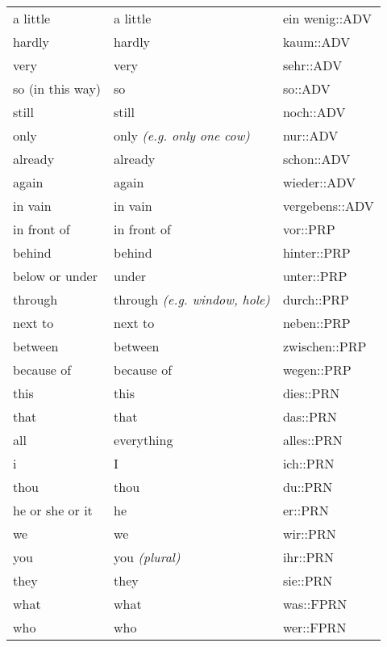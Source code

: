 \begin{center}
\begin{longtable}{lll}
{\sc \lowercase{	A LITTLE	}}	&	a little		&	ein wenig::ADV	\\
{\sc \lowercase{	HARDLY	}}	&	hardly		&	kaum::ADV	\\
{\sc \lowercase{	VERY	}}	&	very		&	sehr::ADV	\\
{\sc \lowercase{	SO \footnotesize (IN THIS WAY)	}}	&	so		&	so::ADV	\\
{\sc \lowercase{	STILL	}}	&	still		&	noch::ADV	\\
{\sc \lowercase{	ONLY	}}	&	only	\textit{\footnotesize (e.g. only one cow)}	&	nur::ADV	\\
{\sc \lowercase{	ALREADY	}}	&	already		&	schon::ADV	\\
{\sc \lowercase{	AGAIN	}}	&	again		&	wieder::ADV	\\
{\sc \lowercase{	IN VAIN	}}	&	in vain		&	vergebens::ADV	\\
{\sc \lowercase{	IN FRONT OF	}}	&	in front of		&	vor::PRP	\\
{\sc \lowercase{	BEHIND	}}	&	behind		&	hinter::PRP	\\
{\sc \lowercase{	BELOW OR UNDER	}}	&	under		&	unter::PRP	\\
{\sc \lowercase{	THROUGH	}}	&	through	\textit{\footnotesize (e.g. window, hole)}	&	durch::PRP	\\
{\sc \lowercase{	NEXT TO	}}	&	next to		&	neben::PRP	\\
{\sc \lowercase{	BETWEEN	}}	&	between		&	zwischen::PRP	\\
{\sc \lowercase{	BECAUSE OF	}}	&	because of		&	wegen::PRP	\\
{\sc \lowercase{	THIS	}}	&	this		&	dies::PRN	\\
{\sc \lowercase{	THAT	}}	&	that		&	das::PRN	\\
{\sc \lowercase{	ALL	}}	&	everything		&	alles::PRN	\\
{\sc \lowercase{	I	}}	&	I		&	ich::PRN	\\
{\sc \lowercase{	THOU	}}	&	thou		&	du::PRN	\\
{\sc \lowercase{	HE OR SHE OR IT	}}	&	he		&	er::PRN	\\
{\sc \lowercase{	WE	}}	&	we		&	wir::PRN	\\
{\sc \lowercase{	YOU	}}	&	you	\textit{\footnotesize (plural)}	&	ihr::PRN	\\
{\sc \lowercase{	THEY	}}	&	they		&	sie::PRN	\\
{\sc \lowercase{	WHAT	}}	&	what		&	was::FPRN	\\
{\sc \lowercase{	WHO	}}	&	who		&	wer::FPRN	\\

\end{longtable}
\end{center}

